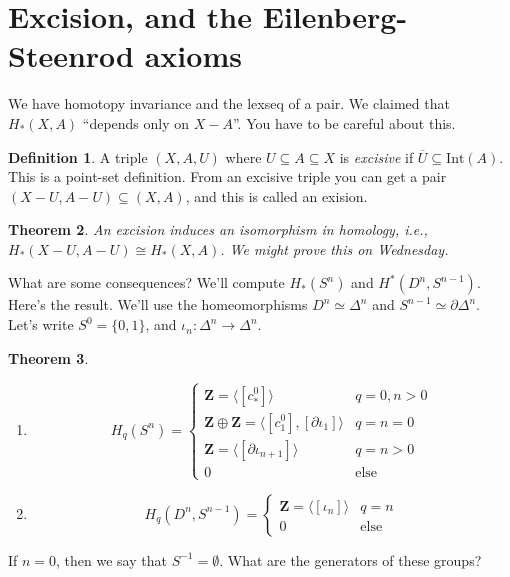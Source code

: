 \documentclass{amsart}
\theoremstyle{theorem}
\newtheorem{theorem}{Theorem}[section]
\theoremstyle{definition}
\newtheorem{definition}[theorem]{Definition}
\newcommand{\Z}{\mathbf Z}
\begin{document}
\section{Excision, and the Eilenberg-Steenrod axioms}
We have homotopy invariance and the lexseq of a pair. We claimed that $ H_\ast(X,A)$ ``depends only on $X-A$''. You have to be careful about this. 
\begin{definition}
A triple $(X,A,U)$ where $U\subseteq A\subseteq X$ is \emph{excisive} if $\overline{U}\subseteq\mathrm{Int}(A)$. This is a point-set definition. From an excisive triple you can get a pair $(X-U,A-U)\subseteq (X,A)$, and this is called an exision.
\end{definition}
\begin{theorem}
An excision induces an isomorphism in homology, i.e., $ H_\ast(X-U,A-U)\cong H_\ast(X,A)$. We might prove this on Wednesday.
\end{theorem}
What are some consequences? We'll compute $ H_\ast(S^n)$ and $ H^\ast(D^n,S^{n-1})$. Here's the result. We'll use the homeomorphisms $D^n\simeq \Delta^n$ and $S^{n-1}\simeq\partial\Delta^n$. Let's write $S^0=\{0,1\}$, and $\iota_n:\Delta^n\to\Delta^n$.
\begin{theorem}
	\begin{enumerate}
	\item \begin{equation*}
	 H_q(S^n)=\begin{cases}\Z = \langle[c^0_\ast]\rangle & q=0,n>0\\ \Z\oplus\Z = \langle[c^0_1],[\partial\iota_1]\rangle & q=n=0 \\ \Z = \langle[\partial\iota_{n+1}]\rangle & q=n>0 \\ 0 & \text{else} \end{cases}
	\end{equation*}

	\item \begin{equation*}
	 H_q(D^n,S^{n-1}) = \begin{cases}
	\Z=\langle [\iota_n]\rangle & q=n\\
	0 & \text{else}
	\end{cases}
	\end{equation*}
	\end{enumerate}
\end{theorem}
If $n=0$, then we say that $S^{-1}=\emptyset$. What are the generators of these groups?
\end{document}
